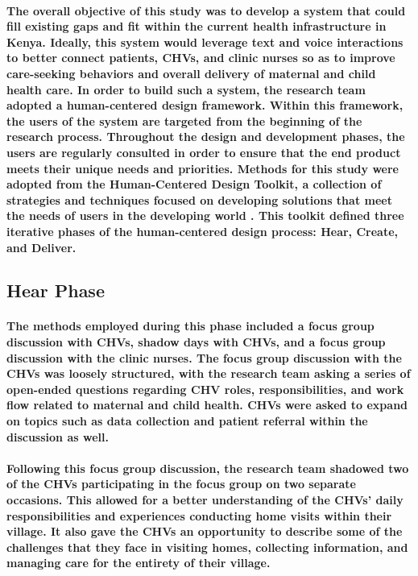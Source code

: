 \paragraph{The overall objective of this study was to develop a system that could fill existing gaps and fit within the current health infrastructure in Kenya. Ideally, this system would leverage text and voice interactions to better connect patients, CHVs, and clinic nurses so as to improve care-seeking behaviors and overall delivery of maternal and child health care. In order to build such a system, the research team adopted a human-centered design framework. Within this framework, the users of the system are targeted from the beginning of the research process. Throughout the design and development phases, the users are regularly consulted in order to ensure that the end product meets their unique needs and priorities. Methods for this study were adopted from the Human-Centered Design Toolkit, a collection of strategies and techniques focused on developing solutions that meet the needs of users in the developing world \citep{HCDToolkit}. This toolkit defined three iterative phases of the human-centered design process: Hear, Create, and Deliver. }

\subsection{Hear Phase}
\paragraph{The methods employed during this phase included a focus group discussion with CHVs, shadow days with CHVs, and a focus group discussion with the clinic nurses. The focus group discussion with the CHVs was loosely structured, with the research team asking a series of open-ended questions regarding CHV roles, responsibilities, and work flow related to maternal and child health. CHVs were asked to expand on topics such as data collection and patient referral within the discussion as well.}

\paragraph{Following this focus group discussion, the research team shadowed two of the CHVs participating in the focus group on two separate occasions. This allowed for a better understanding of the CHVs' daily responsibilities and experiences conducting home visits within their village. It also gave the CHVs an opportunity to describe some of the challenges that they face in visiting homes, collecting information, and managing care for the entirety of their village.}

